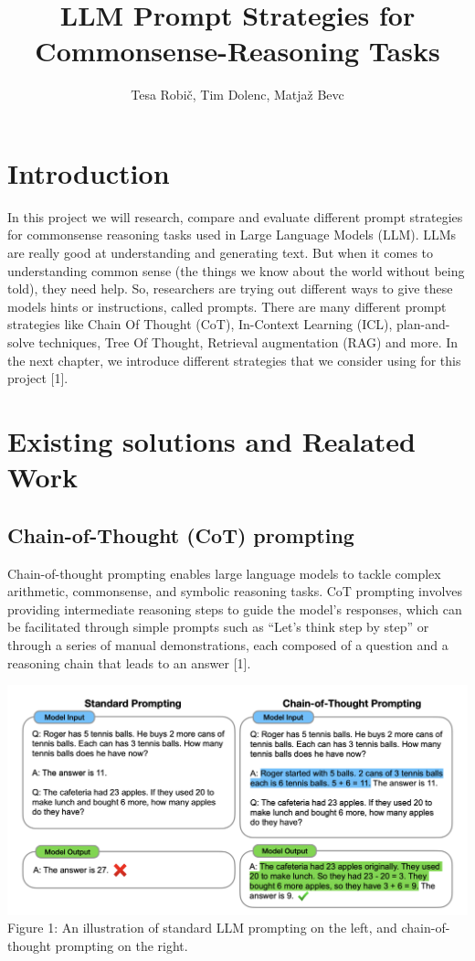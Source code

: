 \documentclass{article}
\title{\textbf{LLM Prompt Strategies for Commonsense-Reasoning Tasks}
}
\author{Tesa Robič, Tim Dolenc, Matjaž Bevc}
\begin{document}
\maketitle


\section{Introduction}

In this project we will research, compare and evaluate different prompt strategies for commonsense reasoning tasks used in Large Language Models (LLM). LLMs are really good at understanding and generating text. But when it comes to understanding common sense (the things we know about the world without being told), they need help. So, researchers are trying out different ways to give these models hints or instructions, called prompts. There are many different prompt strategies like Chain Of Thought (CoT), In-Context Learning (ICL), plan-and-solve techniques, Tree Of Thought, Retrieval augmentation (RAG) and more. In the next chapter, we introduce different strategies that we consider using for this project [1].


\section{Existing solutions and Realated Work}
\subsection{Chain-of-Thought (CoT) prompting}

Chain-of-thought prompting enables large language models to tackle complex arithmetic, commonsense, and symbolic reasoning tasks. CoT prompting involves providing intermediate reasoning steps to guide the model’s responses, which can be facilitated through simple prompts such as “Let’s think step by step” or through a series of manual demonstrations, each composed of a question and a reasoning chain that leads to an answer [1].

\begin{center}
    \includegraphics[scale=0.45]{Screenshot 2024-03-21 at 10.21.03.png}
    Figure 1: An illustration of standard LLM prompting on the left, and chain-of-thought prompting on the right.
\end{center}
\end{document}
